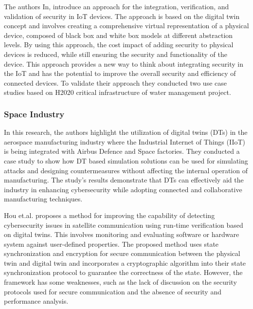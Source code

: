 The authors In\cite{maillet-contozEndtoendSecurityValidation2020}, introduce an approach for the integration, verification, and validation of security in IoT devices. The approach is based on the digital twin concept and involves creating a comprehensive virtual representation of a physical device, composed of black box and white box models at different abstraction levels. By using this approach, the cost impact of adding security to physical devices is reduced, while still ensuring the security and functionality of the device. This approach provides a new way to think about integrating security in the IoT and has the potential to improve the overall security and efficiency of connected devices. To validate their approach they conducted two use case studies based on H2020 critical infrastructure of water management project.

\subsubsection{Space Industry}

In \cite{adrienbacueDigitalTwinsEnhanced2022} this research, the authors highlight the utilization of digital twins (DTs) in the aerospace manufacturing industry where the Industrial Internet of Things (IIoT) is being integrated with Airbus Defence and Space factories. They conducted a case study to show how DT based simulation solutions can be used for simulating attacks and designing countermeasures without affecting the internal operation of manufacturing. The study's results demonstrate that DTs can effectively aid the industry in enhancing cybersecurity while adopting connected and collaborative manufacturing techniques.

Hou et.al. \cite{houDigitalTwinRuntime2022}  proposes a method for improving the capability of detecting cybersecurity issues in satellite communication using run-time verification based on digital twins. This involves monitoring and evaluating software or hardware system against user-defined properties. The proposed method uses state synchronization and encryption for secure communication between the physical twin and digital twin and incorporates a cryptographic algorithm into their state synchronization protocol to guarantee the correctness of the state. However, the framework has some weaknesses, such as the lack of discussion on the security protocols used for secure communication and the absence of security and performance analysis.

